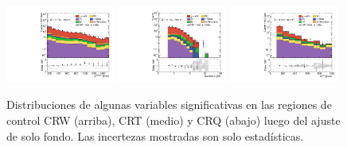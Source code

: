 \begin{figure}[!ht]
\begin{center}
    \includegraphics[width=0.32\textwidth]{images/results/fr2_unblind/can_CRQ_ph_pt0_afterFit.pdf}
    \includegraphics[width=0.32\textwidth]{images/results/fr2_unblind/can_CRQ_jet_n_afterFit.pdf}
    \includegraphics[width=0.32\textwidth]{images/results/fr2_unblind/can_CRQ_met_et_afterFit.pdf}

    \caption{Distribuciones de algunas variables significativas en las regiones de control CRW (arriba), CRT (medio) y CRQ (abajo) luego del ajuste de solo fondo. Las incertezas mostradas son solo estadísticas.}
    \label{fig:cr_dist}
  \end{center}
\end{figure}



